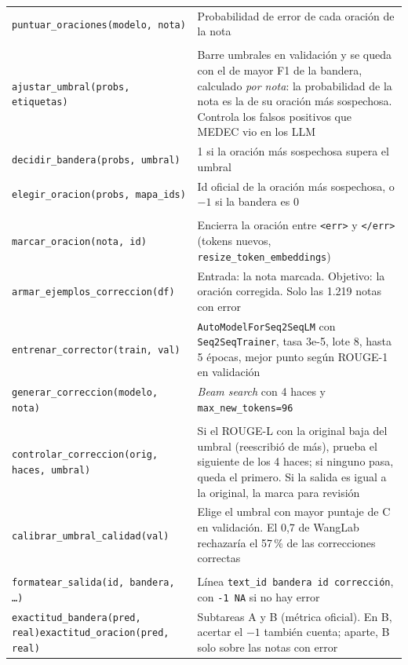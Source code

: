 \documentclass[11pt,a4paper]{article}
\newcommand{\fn}[1]{\texttt{\small #1}}
\begin{document}
{\begin{xltabular}{\textwidth}{>{\raggedright\arraybackslash}p{5.9cm} L}
\fn{puntuar\_oraciones(modelo, nota)} & Probabilidad de error de cada oración de la nota \\
 \\
\fn{ajustar\_umbral(probs, etiquetas)} & Barre umbrales en validación y se queda con el de mayor F1 de la bandera, calculado \emph{por nota}: la probabilidad de la nota es la de su oración más sospechosa. Controla los falsos positivos que MEDEC vio en los LLM \\
\fn{decidir\_bandera(probs, umbral)} & 1 si la oración más sospechosa supera el umbral \\
\fn{elegir\_oracion(probs, mapa\_ids)} & Id oficial de la oración más sospechosa, o $-1$ si la bandera es 0 \\
 \\
\fn{marcar\_oracion(nota, id)} & Encierra la oración entre \texttt{<err>} y \texttt{</err>} (tokens nuevos, \fn{resize\_token\_embeddings}) \\
\fn{armar\_ejemplos\_correccion(df)} & Entrada: la nota marcada. Objetivo: la oración corregida. Solo las 1.219 notas con error \\
\fn{entrenar\_corrector(train, val)} & \fn{AutoModelForSeq2SeqLM} con \fn{Seq2SeqTrainer}, tasa 3e-5, lote 8, hasta 5 épocas, mejor punto según ROUGE-1 en validación \\
\fn{generar\_correccion(modelo, nota)} & \emph{Beam search} con 4 haces y \fn{max\_new\_tokens=96} \\
 \\
\fn{controlar\_correccion(orig, haces, umbral)} & Si el ROUGE-L con la original baja del umbral (reescribió de más), prueba el siguiente de los 4 haces; si ninguno pasa, queda el primero. Si la salida es igual a la original, la marca para revisión \\
\fn{calibrar\_umbral\_calidad(val)} & Elige el umbral con mayor puntaje de C en validación. El 0,7 de WangLab rechazaría el 57\,\% de las correcciones correctas \\
 \\
\fn{formatear\_salida(id, bandera, \ldots)} & Línea \texttt{text\_id bandera id corrección}, con \texttt{-1 NA} si no hay error \\
\fn{exactitud\_bandera(pred, real)}\newline\fn{exactitud\_oracion(pred, real)} & Subtareas A y B (métrica oficial). En B, acertar el $-1$ también cuenta; aparte, B solo sobre las notas con error \\

\end{xltabular}}
\end{document}
